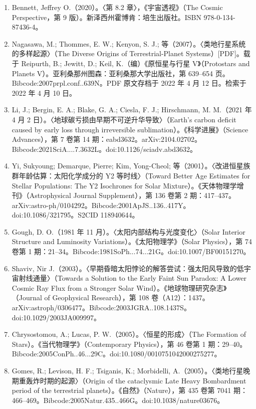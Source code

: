 \begin{enumerate}
\item Bennett, Jeffrey O.（2020）。〈第 8.2 章〉，《宇宙透视》（The Cosmic Perspective，第 9 版）。新泽西州霍博肯：培生出版社。ISBN 978-0-134-87436-4。
\item Nagasawa, M.; Thommes, E. W.; Kenyon, S. J.; 等（2007）。〈类地行星系统的多样起源〉（The Diverse Origins of Terrestrial-Planet Systems）[PDF]。载于 Reipurth, B.; Jewitt, D.; Keil, K.（编）《原恒星与行星 V》（Protostars and Planets V）。亚利桑那州图森：亚利桑那大学出版社，第 639–654 页。Bibcode:2007prpl.conf..639N。PDF 原文存档于 2022 年 4 月 12 日。检索于 2022 年 4 月 10 日。
\item Li, J.; Bergin, E. A.; Blake, G. A.; Ciesla, F. J.; Hirschmann, M. M.（2021 年 4 月 2 日）。〈地球碳亏损由早期不可逆升华导致〉（Earth's carbon deficit caused by early loss through irreversible sublimation）。《科学进展》（Science Advances），第 7 卷第 14 期：eabd3632。arXiv:2104.02702。Bibcode:2021SciA....7.3632L。doi:10.1126/sciadv.abd3632。
\item Yi, Sukyoung; Demarque, Pierre; Kim, Yong-Cheol; 等（2001）。〈改进恒星族群年龄估算：太阳化学成分的 Y2 等时线〉（Toward Better Age Estimates for Stellar Populations: The Y2 Isochrones for Solar Mixture）。《天体物理学增刊》（Astrophysical Journal Supplement），第 136 卷第 2 期：417–437。arXiv:astro-ph/0104292。Bibcode:2001ApJS..136..417Y。doi:10.1086/321795。S2CID 118940644。
\item Gough, D. O.（1981 年 11 月）。〈太阳内部结构与光度变化〉（Solar Interior Structure and Luminosity Variations）。《太阳物理学》（Solar Physics），第 74 卷第 1 期：21–34。Bibcode:1981SoPh...74...21G。doi:10.1007/BF00151270。
\item Shaviv, Nir J.（2003）。〈早期昏暗太阳悖论的解答尝试：强太阳风导致的低宇宙射线通量〉（Towards a Solution to the Early Faint Sun Paradox: A Lower Cosmic Ray Flux from a Stronger Solar Wind）。《地球物理研究杂志》（Journal of Geophysical Research），第 108 卷（A12）：1437。arXiv:astroph/0306477。Bibcode:2003JGRA..108.1437S。doi:10.1029/2003JA009997。
\item Chrysostomou, A.; Lucas, P. W.（2005）。〈恒星的形成〉（The Formation of Stars）。《当代物理学》（Contemporary Physics），第 46 卷第 1 期：29–40。Bibcode:2005ConPh..46...29C。doi:10.1080/0010751042000275277。
\item Gomes, R.; Levison, H. F.; Tsiganis, K.; Morbidelli, A.（2005）。〈类地行星晚期重轰炸时期的起源〉（Origin of the cataclysmic Late Heavy Bombardment period of the terrestrial planets）。《自然》（Nature），第 435 卷第 7041 期：466–469。Bibcode:2005Natur.435..466G。doi:10.1038/nature03676。

\end{enumerate}
